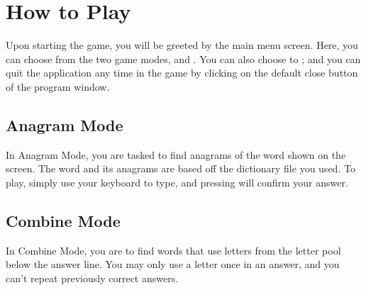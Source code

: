\documentclass[letterpaper,10pt,english,openany,oneside]{sphinxmanual}
\begin{document}
%
\begin{sphinxVerbatim}[commandchars=\\\{\}]
    
\end{sphinxVerbatim}


\chapter{How to Play}
\label{\detokenize{index:how-to-play}}
Upon starting the game, you will be greeted by the
main menu screen. Here, you can choose from the two
game modes,  and . You can
also choose to ; and you can quit the
application any time in the game by clicking on the default
close button of the program window.



\section{Anagram Mode}
\label{\detokenize{index:anagram-mode}}
In Anagram Mode, you are tasked to find anagrams of the word
shown on the screen. The word and its anagrams are based off
the dictionary file you used. To play, simply use your keyboard
to type, and pressing  will confirm your answer.



\section{Combine Mode}
\label{\detokenize{index:combine-mode}}
In Combine Mode, you are to find words that use letters from
the letter pool below the answer line. You may only use a letter
once in an answer, and you can’t repeat previously correct answers.

\end{document}
